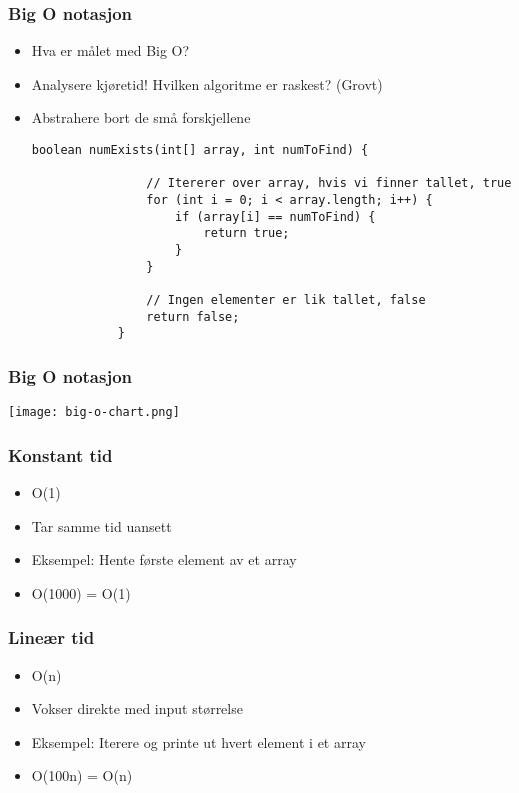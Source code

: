 \documentclass[norsk, handout]{beamer}
\begin{document}
    \begin{frame}[fragile]
        \frametitle{Big O notasjon}
        \begin{itemize}
            \item Hva er målet med Big O?
            \pause
        \item Analysere kjøretid! Hvilken algoritme er raskest? (Grovt)
        \pause
        \item Abstrahere bort de små forskjellene
        \pause
        \begin{lstlisting}[basicstyle=\scriptsize]
            boolean numExists(int[] array, int numToFind) {

                // Itererer over array, hvis vi finner tallet, true
                for (int i = 0; i < array.length; i++) {
                    if (array[i] == numToFind) {
                        return true;
                    }
                }

                // Ingen elementer er lik tallet, false
                return false;
            }
		\end{lstlisting}
        \end{itemize}

    \end{frame}

    \begin{frame}
        \frametitle{Big O notasjon}
        \texttt{[image: big-o-chart.png]}
    \end{frame}

    \begin{frame}
        \frametitle{Konstant tid}
        \begin{itemize}
            \item O(1)
            \item Tar samme tid uansett
            \item Eksempel: Hente første element av et array
            \item O(1000) = O(1)
        \end{itemize}
    \end{frame}

    \begin{frame}
        \frametitle{Lineær tid}

        \begin{itemize}
            \item O(n)
            \item Vokser direkte med input størrelse
            \item Eksempel: Iterere og printe ut hvert element i et array
            \item O(100n) = O(n)
        \end{itemize}

    \end{frame}
\end{document}
